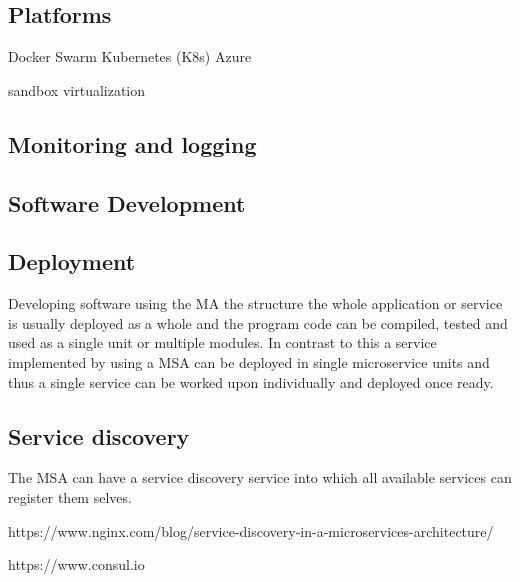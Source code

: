 \subsection{Platforms}
\begin{sloppypar}

\end{sloppypar}

Docker Swarm
Kubernetes (K8s)
Azure

sandbox
virtualization 

\subsection{Monitoring and logging}

\subsection{Software Development}
\subsection{Deployment}
\begin{sloppypar}
    Developing software using the MA the structure the whole application or service 
    is usually deployed as a whole and the program code can be compiled, tested 
    and used as a single unit or multiple modules. In contrast to this a service 
    implemented by using a MSA can be deployed in single microservice units and 
    thus a single service can be worked upon individually and deployed once ready.
\end{sloppypar}

\subsection{Service discovery}
\begin{sloppypar}
    The MSA can have a service discovery service into which all available services 
    can register them selves.

    https://www.nginx.com/blog/service-discovery-in-a-microservices-architecture/

    https://www.consul.io


\end{sloppypar}

